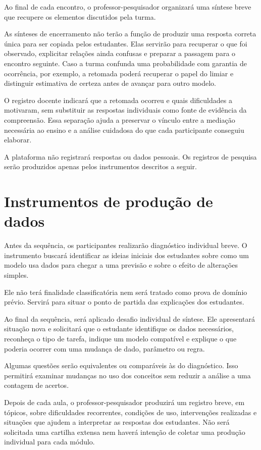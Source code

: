 Ao final de cada encontro, o professor-pesquisador organizará uma síntese breve que recupere os elementos discutidos pela turma.

As sínteses de encerramento não terão a função de produzir uma resposta correta única para ser copiada pelos estudantes. Elas servirão para recuperar o que foi observado, explicitar relações ainda confusas e preparar a passagem para o encontro seguinte. Caso a turma confunda uma probabilidade com garantia de ocorrência, por exemplo, a retomada poderá recuperar o papel do limiar e distinguir estimativa de certeza antes de avançar para outro modelo.

O registro docente indicará que a retomada ocorreu e quais dificuldades a motivaram, sem substituir as respostas individuais como fonte de evidência da compreensão. Essa separação ajuda a preservar o vínculo entre a mediação necessária ao ensino e a análise cuidadosa do que cada participante conseguiu elaborar.

A plataforma não registrará respostas ou dados pessoais. Os registros de pesquisa serão produzidos apenas pelos instrumentos descritos a seguir.

\section{Instrumentos de produção de dados}

Antes da sequência, os participantes realizarão diagnóstico individual breve. O instrumento buscará identificar as ideias iniciais dos estudantes sobre como um modelo usa dados para chegar a uma previsão e sobre o efeito de alterações simples.

Ele não terá finalidade classificatória nem será tratado como prova de domínio prévio. Servirá para situar o ponto de partida das explicações dos estudantes.

Ao final da sequência, será aplicado desafio individual de síntese. Ele apresentará situação nova e solicitará que o estudante identifique os dados necessários, reconheça o tipo de tarefa, indique um modelo compatível e explique o que poderia ocorrer com uma mudança de dado, parâmetro ou regra.

Algumas questões serão equivalentes ou comparáveis às do diagnóstico. Isso permitirá examinar mudanças no uso dos conceitos sem reduzir a análise a uma contagem de acertos.

Depois de cada aula, o professor-pesquisador produzirá um registro breve, em tópicos, sobre dificuldades recorrentes, condições de uso, intervenções realizadas e situações que ajudem a interpretar as respostas dos estudantes. Não será solicitada uma cartilha extensa nem haverá intenção de coletar uma produção individual para cada módulo.

